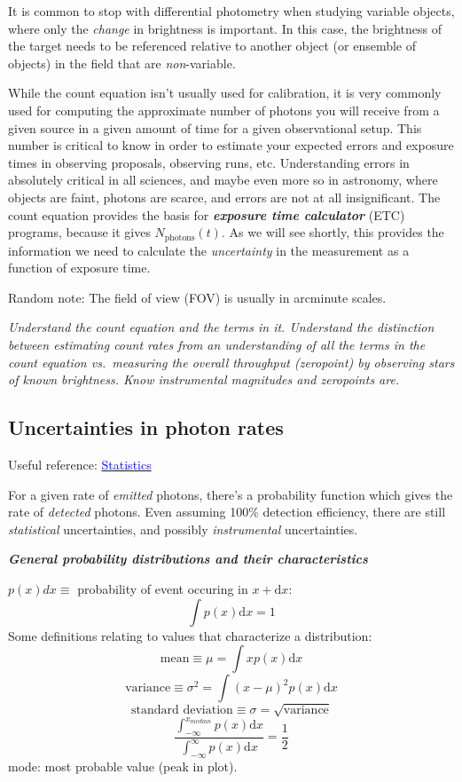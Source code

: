 \documentclass[12pt]{article}
\begin{document}
It is common to stop with differential photometry when studying
variable objects, where only the \emph{change} in brightness is
important. In this case, the brightness of the target needs to be
referenced relative to another object (or ensemble of objects)
in the field that are \emph{non}-variable.

While the count equation isn't usually used for calibration,
it is very commonly used for computing the approximate number of
photons you will receive from a given source in a given amount of time
for a given observational setup. This number is critical to know in
order to estimate your expected errors and exposure times in observing
proposals, observing runs, etc. Understanding errors in absolutely
critical in all sciences, and maybe even more so in astronomy, where
objects are faint, photons are scarce, and errors are not at all
insignificant. The count equation provides the basis for
\textbf\emph{exposure time calculator} (ETC) programs,
because it gives $N_{\textrm{photons}}(t)$.
As we will see shortly, this provides the information we need to
calculate the \emph{uncertainty} in the measurement
as a function of exposure time.

Random note: The field of view (FOV) is usually in arcminute scales.

\textcolor{om}{\emph{Understand the count equation and the terms in
it. Understand the distinction between estimating count rates from an
understanding of all the terms in the count equation vs.\ measuring the
overall throughput (zeropoint) by observing stars of known brightness.
Know instrumental magnitudes and zeropoints are.}}
\subsection{Uncertainties in photon rates}
Useful reference:
\href{http://users.wfu.edu/ecarlson/skeptic/statistics.pdf}
{\textcolor{blue}{Statistics}}

For a given rate of \emph{emitted} photons, there's a probability function
which gives the rate of \emph{detected} photons.
Even assuming 100\% detection efficiency, there are still
\emph{statistical} uncertainties, and possibly \emph{instrumental}
uncertainties.

\textbf{\emph{General probability distributions and their
characteristics}}

$p(x)dx \equiv$ probability of event occuring in $x + \textrm{d}x$:
        $$ \int p(x)\textrm{d}x = 1 $$
Some definitions relating to values that characterize a distribution:
$$    \textrm{mean} \equiv \mu = \int xp(x)\textrm{d}x $$
$$    \textrm{variance} \equiv \sigma^{2} = \int (x-\mu)^{2} p(x)\textrm{d}x $$
$$    \textrm{standard\ deviation} \equiv \sigma =
        \sqrt{\textrm{variance}} $$
$$    \frac{ \int_{-\infty}^{x_{median}} p(x)\textrm{d}x }
      { \int_{-\infty}^{\infty} p(x)\textrm{d}x }
      = \frac{1}{2} $$
mode: most probable value (peak in plot).
\end{document}
